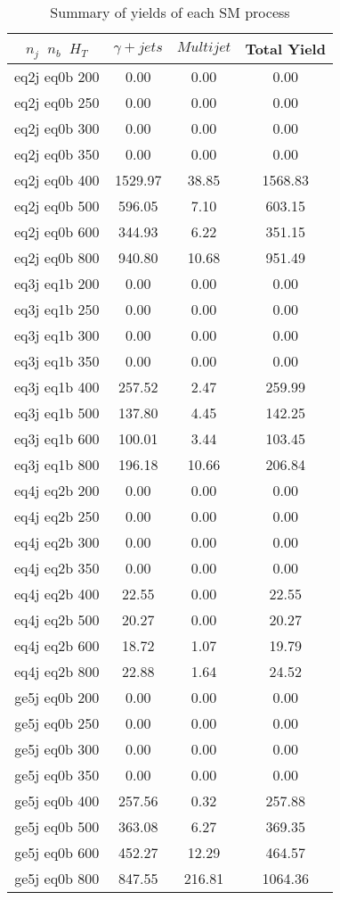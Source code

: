 \begin{longtable}{| c | c | c | c  | }
\caption{Summary of yields of each SM process} \label{tab:yieldSM-singlephoton} \\    \hline 
$n_{j}$~$n_{b}$~$H_{T}$ & $\gamma+jets$ & $Multijet$ & Total Yield\\ \hline 
eq2j eq0b 200 & 0.00 & 0.00 & 0.00\\ \hline 
eq2j eq0b 250 & 0.00 & 0.00 & 0.00\\ \hline 
eq2j eq0b 300 & 0.00 & 0.00 & 0.00\\ \hline 
eq2j eq0b 350 & 0.00 & 0.00 & 0.00\\ \hline 
eq2j eq0b 400 & 1529.97 & 38.85 & 1568.83\\ \hline 
eq2j eq0b 500 & 596.05 & 7.10 & 603.15\\ \hline 
eq2j eq0b 600 & 344.93 & 6.22 & 351.15\\ \hline 
eq2j eq0b 800 & 940.80 & 10.68 & 951.49\\ \hline 
eq3j eq1b 200 & 0.00 & 0.00 & 0.00\\ \hline 
eq3j eq1b 250 & 0.00 & 0.00 & 0.00\\ \hline 
eq3j eq1b 300 & 0.00 & 0.00 & 0.00\\ \hline 
eq3j eq1b 350 & 0.00 & 0.00 & 0.00\\ \hline 
eq3j eq1b 400 & 257.52 & 2.47 & 259.99\\ \hline 
eq3j eq1b 500 & 137.80 & 4.45 & 142.25\\ \hline 
eq3j eq1b 600 & 100.01 & 3.44 & 103.45\\ \hline 
eq3j eq1b 800 & 196.18 & 10.66 & 206.84\\ \hline 
eq4j eq2b 200 & 0.00 & 0.00 & 0.00\\ \hline 
eq4j eq2b 250 & 0.00 & 0.00 & 0.00\\ \hline 
eq4j eq2b 300 & 0.00 & 0.00 & 0.00\\ \hline 
eq4j eq2b 350 & 0.00 & 0.00 & 0.00\\ \hline 
eq4j eq2b 400 & 22.55 & 0.00 & 22.55\\ \hline 
eq4j eq2b 500 & 20.27 & 0.00 & 20.27\\ \hline 
eq4j eq2b 600 & 18.72 & 1.07 & 19.79\\ \hline 
eq4j eq2b 800 & 22.88 & 1.64 & 24.52\\ \hline 
ge5j eq0b 200 & 0.00 & 0.00 & 0.00\\ \hline 
ge5j eq0b 250 & 0.00 & 0.00 & 0.00\\ \hline 
ge5j eq0b 300 & 0.00 & 0.00 & 0.00\\ \hline 
ge5j eq0b 350 & 0.00 & 0.00 & 0.00\\ \hline 
ge5j eq0b 400 & 257.56 & 0.32 & 257.88\\ \hline 
ge5j eq0b 500 & 363.08 & 6.27 & 369.35\\ \hline 
ge5j eq0b 600 & 452.27 & 12.29 & 464.57\\ \hline 
ge5j eq0b 800 & 847.55 & 216.81 & 1064.36\\ \hline 
    \hline 
    \hline 
\end{longtable}
